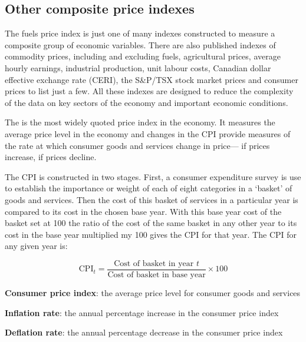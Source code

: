 

\subsection*{Other composite price indexes}

The fuels price index is just one of many indexes constructed to measure a composite group of economic variables. There are also published indexes of commodity prices, including and excluding fuels, agricultural prices, average hourly earnings, industrial production, unit labour costs, Canadian dollar effective exchange rate (CERI), the S\&P/TSX stock market prices and consumer prices to list just a few. All these indexes are designed to reduce the complexity of the data on key sectors of the economy and important economic conditions.

The  is the most widely quoted price index in the economy. It measures the average price level in the economy and changes in the CPI provide measures of the rate at which consumer goods and services change in price--- if prices increase,  if prices decline. 

The CPI is constructed in two stages. First, a consumer expenditure survey is use to establish the importance or weight of each of eight categories in a `basket' of goods and services. Then the cost of this basket of services in a particular year is compared to its cost in the chosen base year. With this base year cost of the basket set at 100 the ratio of the cost of the same basket in any other year to its cost in the base year multiplied my 100 gives the CPI for that year. The CPI for any given year is:

\begin{equation} \label{eq:cpi} 
\text{CPI}_t=\frac{\text{Cost of basket in year }t}{\text{Cost of basket in base year}}\times 100
\end{equation} 

\begin{DefBox}
\textbf{Consumer price index}: the average price level for consumer goods and services

\textbf{Inflation rate}: the annual percentage increase in the consumer price index

\textbf{Deflation rate}: the annual percentage decrease in the consumer price index
\end{DefBox}

